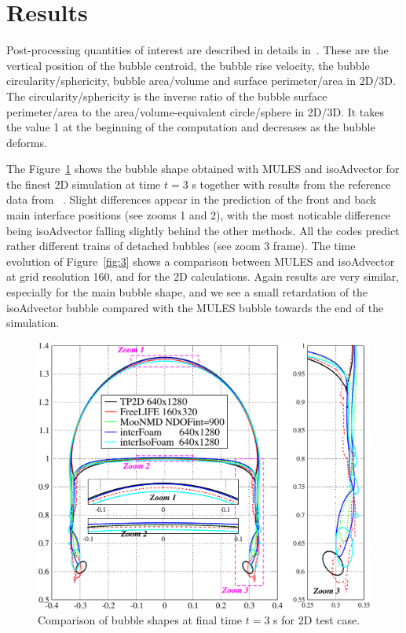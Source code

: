 \documentclass[review]{elsarticle}
\begin{document}
\section{Results}\label{sec_results}
Post-processing quantities of interest are described in details in~\cite{Hysing2009,Adelsberger2014}. These are the vertical position of the bubble centroid, the bubble rise velocity, the bubble circularity/sphericity, bubble area/volume and surface perimeter/area in 2D/3D. The circularity/sphericity is the inverse ratio of the bubble surface perimeter/area to the area/volume-equivalent circle/sphere in 2D/3D. It takes the value 1 at the beginning of the computation and decreases as the bubble deforms.
   
The Figure~\ref{fig:2} shows the bubble shape obtained with MULES and isoAdvector for the finest 2D simulation at time $t = 3$ s together with results from the reference data from ~\cite{Hysing2009}. Slight differences appear in the prediction of the front and back main interface positions (see zooms 1 and 2), with the most noticable difference being isoAdvector falling slightly behind the other methods. All the codes predict rather different trains of detached bubbles (see zoom 3 frame). The time evolution of Figure~\ref{fig:3} shows a comparison between MULES and isoAdvector at grid resolution 160, and for the 2D calculations. Again results are very similar, especially for the main bubble shape, and we see a small retardation of the isoAdvector bubble compared with the MULES bubble towards the end of the simulation.
\begin{figure}[!h]
  \includegraphics[scale=0.5]{figures/bubble_shape2D_t=3.pdf}
  \caption{Comparison of bubble shapes at final time $t=3$ s for 2D test case.}
  \label{fig:2}
\end{figure}
\end{document}
